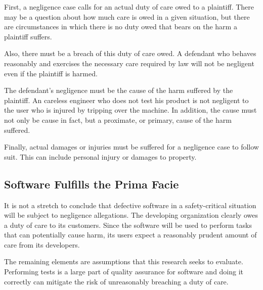 First, a negligence case calls for an actual duty of care owed to a plaintiff.
There may be a question about how much care is owed in a given situation, but
there are circumstances in which there is no duty owed that bears on the harm a
plaintiff suffers.

Also, there must be a breach of this duty of care owed. A defendant who behaves
reasonably and exercises the necessary care required by law will not be
negligent even if the plaintiff is harmed.

The defendant's negligence must be the cause of the harm suffered by the
plaintiff. An careless engineer who does not test his product is not negligent
to the user who is injured by tripping over the machine. In addition, the cause
must not only be cause in fact, but a proximate, or primary, cause of the harm
suffered.

Finally, actual damages or injuries must be suffered for a negligence case to
follow suit. This can include personal injury or damages to property.

\subsection{Software Fulfills the Prima Facie}

It is not a stretch to conclude that defective software in a safety-critical
situation will be subject to negligence allegations. The developing
organization clearly owes a duty of care to its customers. Since the software
will be used to perform tasks that can potentially cause harm, its users expect
a reasonably prudent amount of care from its developers.

The remaining elements are assumptions that this research seeks to evaluate.
Performing tests is a large part of quality assurance for software and doing it
correctly can mitigate the risk of unreasonably breaching a duty of care.


